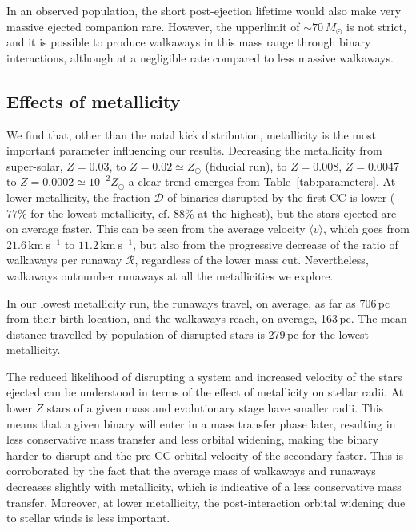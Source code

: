 \documentclass{aa}
\DeclareRobustCommand{\Tabref}[1]{Table~\ref{#1}}
\begin{document}
In an observed
population, the short post-ejection lifetime would also make very
massive ejected companion rare. However, the upperlimit of
$\sim$$70\,M_\odot$ is not strict, and it is possible to produce
walkaways in this mass range through binary interactions, although at
a negligible rate compared to less massive walkaways.



\subsection{Effects of metallicity }
\label{sec:Z}

We find that, other than the natal kick distribution, metallicity is the most important parameter
influencing our results. Decreasing the metallicity from super-solar,
$Z=0.03$, to $Z=0.02\simeq Z_\odot$ (fiducial run), to
$Z=0.008$, $Z=0.0047$ to $Z=0.0002\simeq10^{-2}Z_\odot$ a clear trend
emerges from \Tabref{tab:parameters}. At lower metallicity, the
fraction $\mathcal{D}$ of binaries disrupted by the first CC
is lower ($77\%$ for the lowest metallicity, cf. $88\%$ at the highest), but the stars ejected are on average
faster. This can be seen from the average velocity $\langle v\rangle$,
which goes from $21.6\,\mathrm{km \ s^{-1}}$ to $11.2\,\mathrm{km\ s^{-1}}$, but also from the progressive decrease of the ratio of walkaways per runaway
$\mathcal{R}$, regardless of the lower mass cut. Nevertheless,
walkaways outnumber runaways at all the metallicities we explore.

In our lowest metallicity run, the runaways travel, on average, as far as 706\,pc from their birth
location, and the walkaways reach, on average, 163\,pc. The mean
distance travelled by population of disrupted stars is 279\,pc for
the lowest metallicity.

The reduced likelihood of disrupting a system and increased velocity
of the stars ejected can be understood in
terms of the effect of metallicity on stellar radii. At lower $Z$
stars of a given mass and evolutionary stage have smaller radii. This means that a given
binary will enter in a mass transfer phase later, resulting in less conservative mass transfer and 
less orbital widening, making the binary harder to
disrupt and the pre-CC orbital velocity of the secondary
faster. This is corroborated by the fact that the average mass of
walkaways and runaways decreases slightly with metallicity, which is indicative of
a less conservative mass transfer. Moreover, at lower metallicity, the post-interaction orbital widening
due to stellar winds is less important.
\end{document}
